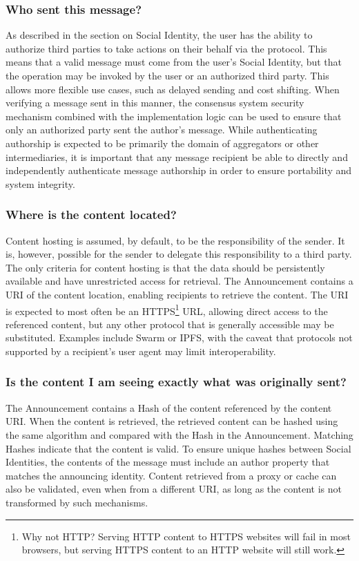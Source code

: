 \documentclass[12pt,letterpaper]{article}
\begin{document}
\subsubsection{Who sent this message?}

As described in the section on Social Identity, the user has the ability to authorize third
parties to take actions on their behalf via the protocol. This means that a valid message
must come from the user's Social Identity, but that the operation may be invoked by the user
or an authorized third party. This allows more flexible use cases, such as delayed sending
and cost shifting. When verifying a message sent in this manner, the consensus system
security mechanism combined with the implementation logic can be used to ensure that only an
authorized party sent the author's message. While authenticating authorship is expected to
be primarily the domain of aggregators or other intermediaries, it is important that any
message recipient be able to directly and independently authenticate message authorship in
order to ensure portability and system integrity.

\subsubsection{Where is the content located?}

Content hosting is assumed, by default, to be the responsibility of the sender. It is,
however, possible for the sender to delegate this responsibility to a third party. The only
criteria for content hosting is that the data should be persistently available and have
unrestricted access for retrieval. The Announcement contains a URI of the content location,
enabling recipients to retrieve the content. The URI is expected to most often be an
HTTPS\footnote{Why not HTTP? Serving HTTP content to HTTPS websites will fail in most
  browsers, but serving HTTPS content to an HTTP website will still work.} URL, allowing
direct access to the referenced content, but any other protocol that is generally accessible
may be substituted. Examples include Swarm or IPFS, with the caveat that protocols not
supported by a recipient's user agent may limit interoperability.

\subsubsection{Is the content I am seeing exactly what was originally sent?}

The Announcement contains a Hash of the content referenced by the content URI. When the
content is retrieved, the retrieved content can be hashed using the same algorithm and
compared with the Hash in the Announcement. Matching Hashes indicate that the content is
valid. To ensure unique hashes between Social Identities, the contents of the message must
include an author property that matches the announcing identity. Content retrieved from a
proxy or cache can also be validated, even when from a different URI, as long as the content
is not transformed by such mechanisms.
\end{document}
